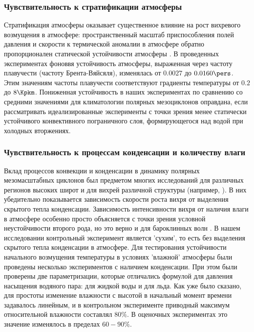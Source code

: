 \subsubsection{Чувствительность к стратификации атмосферы}
Стратификация атмосферы оказывает существенное влияние на рост вихревого возмущения в атмосфере: пространственный масштаб приспособления полей давления и скорости к термической аномалии в атмосфере обратно пропорционален статической устойчивости атмосферы \citep{Holton2004}. В проведенных экспериментах фоноввя устойчивость атмосферы, выраженная через частоту плавучести (частоту Брента-Вяйсяля), изменялась от $0.0027$ до $0.0160\pers$. Этим значениям частоты плавучести соответствуют градиенты температуры от $0.2$ до $8\Kpkm$. Пониженная устойчивость в наших экспериментах по сравнению со средними значениями для климатологии полярных мезоциклонов оправдана, если рассматривать идеализированные эксперименты с точки зрения менее статически устойчивого конвективного пограничного слоя, формирующегося над водой при холодных вторжениях. 

\subsubsection{Чувствительность к процессам конденсации и количеству влаги}
Вклад процессов конвекции и конденсации в динамику полярных мезомасштабных циклонов был предметом многих исследований для различных регионов высоких широт и для вихрей различной структуры (например, \citep{SardieWarner1983, ForeEtAl2012}). В них убедительно показывается зависимость скорости роста вихря от выделения скрытого тепла конденсации. Зависимость интенсивности вихря от наличия влаги в атмосфере особенно просто объясняется с точки зрения условной неустойчивости второго рода, но это верно и для бароклинных волн \citep{YanaseNiino2007}. В нашем исследовании контрольный эксперимент является 'сухим', то есть без выделения скрытого тепла конденсации в атмосфере. Для тестирования устойчивости начального возмущения температуры в условиях 'влажной' атмосферы были проведены несколько экспериментов с наличием конденсации. При этом были проверены две параметризации, которые отличались формулой для давления насыщения водяного пара: для жидкой воды и для льда. Как уже было сказано, для простоты изменение влажности с высотой в начальный момент времени задавалось линейным, и в контрольном эксперименте приводный максимум относительной влажности составлял $80\%$. В оценочных экспериментах это значение изменялось в пределах $60-90\%$.

